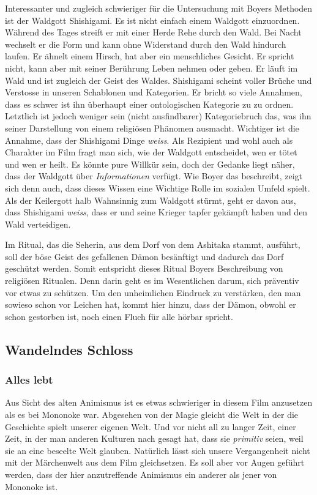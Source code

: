 Interessanter und zugleich schwieriger für die Untersuchung mit Boyers Methoden ist der Waldgott Shishigami. Es ist nicht einfach einem Waldgott einzuordnen. Während des Tages streift er mit einer Herde Rehe durch den Wald. Bei Nacht wechselt er die Form und kann ohne Widerstand durch den Wald hindurch laufen. Er ähnelt einem Hirsch, hat aber ein menschliches Gesicht. Er spricht nicht, kann aber mit seiner Berührung Leben nehmen oder geben. Er läuft im Wald und ist zugleich der Geist des Waldes. Shishigami scheint voller Brüche und Verstosse in unseren Schablonen und Kategorien. Er bricht so viele Annahmen, dass es schwer ist ihn überhaupt einer ontologischen Kategorie zu zu ordnen. Letztlich ist jedoch weniger sein (nicht ausfindbarer) Kategoriebruch das, was ihn seiner Darstellung von einem religiösen Phänomen ausmacht. Wichtiger ist die Annahme, dass der Shishigami Dinge \emph{weiss}. Als Rezipient und wohl auch als Charakter im Film fragt man sich, wie der Waldgott entscheidet, wen er tötet und wen er heilt. Es könnte pure Willkür sein, doch der Gedanke liegt näher, dass der Waldgott über \emph{Informationen} verfügt. Wie Boyer das beschreibt, zeigt sich denn auch, dass dieses Wissen eine Wichtige Rolle im sozialen Umfeld spielt. Als der Keilergott halb Wahnsinnig zum Waldgott stürmt, geht er davon aus, dass Shishigami \emph{weiss}, dass er und seine Krieger tapfer gekämpft haben und den Wald verteidigen. 

Im Ritual, das die Seherin, aus dem Dorf von dem Ashitaka stammt, ausführt, soll der böse Geist des gefallenen Dämon besänftigt und dadurch das Dorf geschützt werden. Somit entspricht dieses Ritual Boyers Beschreibung von religiösen Ritualen. Denn darin geht es im Wesentlichen darum, sich präventiv vor etwas zu schützen. Um den unheimlichen Eindruck zu verstärken, den man sowieso schon vor Leichen hat, kommt hier hinzu, dass der Dämon, obwohl er schon gestorben ist, noch einen Fluch für alle hörbar spricht. 
 
\subsection{Wandelndes Schloss} 
\subsubsection{Alles lebt} 
Aus Sicht des alten Animismus ist es etwas schwieriger in diesem Film anzusetzen als es bei Mononoke war. Abgesehen von der Magie gleicht die Welt in der die Geschichte spielt unserer eigenen Welt. Und vor nicht all zu langer Zeit, einer Zeit, in der man anderen Kulturen nach gesagt hat, dass sie \emph{primitiv} seien, weil sie an eine beseelte Welt glauben. Natürlich lässt sich unsere Vergangenheit nicht mit der Märchenwelt aus dem Film gleichsetzen. Es soll aber vor Augen geführt werden, dass der hier anzutreffende Animismus ein anderer als jener von Mononoke ist. 


